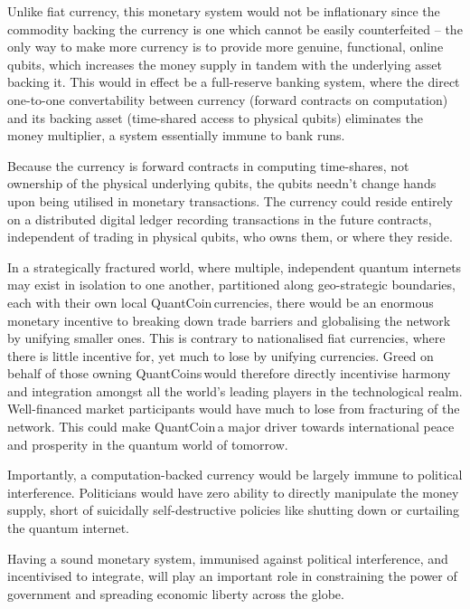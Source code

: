 Unlike fiat currency, this monetary system would not be inflationary since the commodity backing the currency is one which cannot be easily counterfeited -- the only way to make more currency is to provide more genuine, functional, online qubits, which increases the money supply in tandem with the underlying asset backing it. This would in effect be a full-reserve banking system, where the direct one-to-one convertability between currency (forward contracts on computation) and its backing asset (time-shared access to physical qubits) eliminates the money multiplier, a system essentially immune to bank runs.

Because the currency is forward contracts in computing time-shares, not ownership of the physical underlying qubits, the qubits needn't change hands upon being utilised in monetary transactions. The currency could reside entirely on a distributed digital ledger recording transactions in the future contracts, independent of trading in physical qubits, who owns them, or where they reside.

In a strategically fractured world, where multiple, independent quantum internets may exist in isolation to one another, partitioned along geo-strategic boundaries, each with their own local QuantCoin\texttrademark\,currencies, there would be an enormous monetary incentive to breaking down trade barriers and globalising the network by unifying smaller ones. This is contrary to nationalised fiat currencies, where there is little incentive for, yet much to lose by unifying currencies. Greed on behalf of those owning QuantCoins\texttrademark\,would therefore directly incentivise harmony and integration amongst all the world's leading players in the technological realm. Well-financed market participants would have much to lose from fracturing of the network. This could make QuantCoin\texttrademark\,a major driver towards international peace and prosperity in the quantum world of tomorrow.

Importantly, a computation-backed currency would be largely immune to political interference. Politicians would have zero ability to directly manipulate the money supply, short of suicidally self-destructive policies like shutting down or curtailing the quantum internet.

Having a sound monetary system, immunised against political interference, and incentivised to integrate, will play an important role in constraining the power of government and spreading economic liberty across the globe.